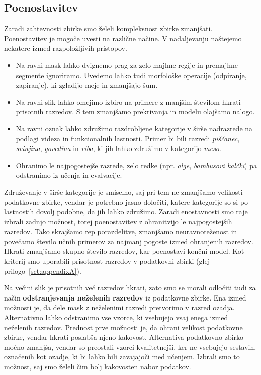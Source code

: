 \documentclass[a4paper,twoside,openright,12pt,slovene]{book}
\begin{document}
        \subsection{Poenostavitev} \label{sct:eir-podatkovnazbirka-poenostavitev}

            Zaradi zahtevnosti zbirke smo želeli kompleksnost zbirke zmanjšati.
            Poenostavitev je mogoče uvesti na različne načine. V nadaljevanju naštejemo nekatere izmed razpoložljivih pristopov.
            \begin{itemize}
                \item Na ravni mask lahko dvignemo prag za zelo majhne regije in premajhne segmente ignoriramo. Uvedemo lahko tudi morfološke operacije (odpiranje, zapiranje), ki zgladijo meje in zmanjšajo šum.
                \item Na ravni slik lahko omejimo izbiro na primere z manjšim številom hkrati prisotnih razredov. S tem zmanjšamo prekrivanja in modelu olajšamo nalogo.
                \item Na ravni oznak lahko združimo razdrobljene kategorije v širše nadrazrede na podlagi videza in funkcionalnih lastnosti. Primer bi bili razredi \emph{piščanec}, \emph{svinjina}, \emph{govedina} in \emph{riba}, ki jih lahko združimo v kategorijo \emph{meso}.
                \item Ohranimo le najpogostejše razrede, zelo redke (npr. \emph{alge}, \emph{bambusovi kalčki}) pa odstranimo iz učenja in evalvacije.
            \end{itemize}

            Združevanje v širše kategorije je smiselno, saj pri tem ne zmanjšamo velikosti podatkovne zbirke, vendar je potrebno jasno določiti, katere kategorije so si po lastnostih dovolj podobne, da jih lahko združimo.
            Zaradi enostavnosti smo raje izbrali zadnjo možnost, torej poenostavitev z ohranitvijo le najpogostejših razredov. Tako skrajšamo rep porazdelitve, zmanjšamo neuravnoteženost in povečamo število učnih primerov za najmanj pogoste izmed ohranjenih razredov. Hkrati zmanjšamo skupno število razredov, kar poenostavi končni model. Kot kriterij smo uporabili prisotnost razredov v podatkovni zbirki (glej prilogo~\ref{sct:appendixA}).

            Na večini slik je prisotnih več razredov hkrati, zato smo se morali odločiti tudi za način \textbf{odstranjevanja neželenih razredov} iz podatkovne zbirke. Ena izmed možnosti je, da dele mask z neželenimi razredi pretvorimo v razred ozadja. Alternativno lahko odstranimo vse vzorce, ki vsebujejo vsaj enega izmed neželenih razredov.
            Prednost prve možnosti je, da ohrani velikost podatkovne zbirke, vendar hkrati poslabša njeno kakovost. Alternativa podatkovno zbirko močno zmanjša, vendar so preostali vzorci kvalitetnejši, ker ne vsebujejo sestavin, označenih kot ozadje, ki bi lahko bili zavajajoči med učenjem.
            Izbrali smo to možnost, saj smo želeli čim bolj kakovosten nabor podatkov.
\end{document}
